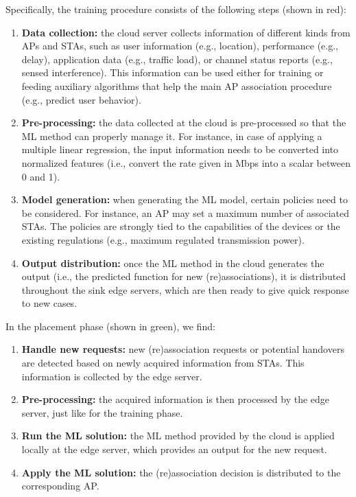 \documentclass[journal]{IEEEtran}
\begin{document}
Specifically, the training procedure consists of the following steps (shown in red):
\begin{enumerate}
	\item \textbf{Data collection:} the cloud server collects information of different kinds from APs and STAs, such as user information (e.g., location), performance (e.g., delay), application data (e.g., traffic load), or channel status reports (e.g., sensed interference). This information can be used either for training or feeding auxiliary algorithms that help the main AP association procedure (e.g., predict user behavior).
	\item \textbf{Pre-processing:} the data collected at the cloud is pre-processed so that the ML method can properly manage it. For instance, in case of applying a multiple linear regression, the input information needs to be converted into normalized features (i.e., convert the rate given in Mbps into a scalar between 0 and 1).
	\item \textbf{Model generation:} when generating the ML model, certain policies need to be considered. For instance, an AP may set a maximum number of associated STAs. The policies are strongly tied to the capabilities of the devices or the existing regulations (e.g., maximum regulated transmission power).
	\item \textbf{Output distribution:} once the ML method in the cloud generates the output (i.e., the predicted function for new (re)associations), it is distributed throughout the sink edge servers, which are then ready to give quick response to new cases.
\end{enumerate}

In the placement phase (shown in green), we find:
\begin{enumerate}
	\item \textbf{Handle new requests:} new (re)association requests or potential handovers are detected based on newly acquired information from STAs. This information is collected by the edge server.
	\item \textbf{Pre-processing:} the acquired information is then processed by the edge server, just like for the training phase.
	\item \textbf{Run the ML solution:} the ML method provided by the cloud is applied locally at the edge server, which provides an output for the new request.
	\item \textbf{Apply the ML solution:} the (re)association decision is distributed to the corresponding AP.
\end{enumerate}
\end{document}

